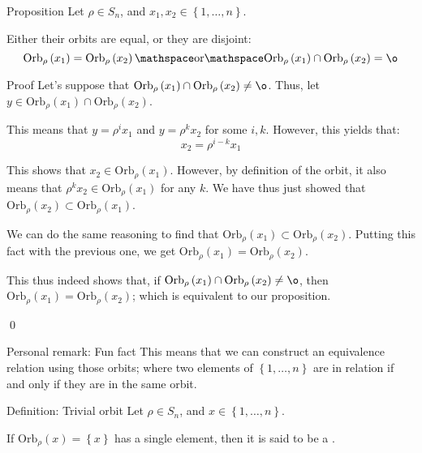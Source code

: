 \documentclass[a4paper]{article}
\begin{document}
\begin{parag}{Proposition}
    Let $\rho \in S_n$, and $x_1, x_2 \in \left\{1, \ldots, n\right\}$.

    Either their orbits are equal, or they are disjoint:
    \[\text{Orb}_{\rho}\left(x_1\right) = \text{Orb}_{\rho}\left(x_2\right) \mathspace \text{or} \mathspace \text{Orb}_{\rho}\left(x_1\right) \cap \text{Orb}_{\rho}\left(x_2\right) = \o\]

    \begin{subparag}{Proof}
        Let's suppose that $\text{Orb}_{\rho}\left(x_1\right) \cap \text{Orb}_{\rho}\left(x_2\right) \neq \o$. Thus, let $y \in \text{Orb}_{\rho}\left(x_1\right) \cap \text{Orb}_{\rho}\left(x_2\right)$.

        This means that $y = \rho^i x_1$ and $y = \rho^k x_2$ for some $i, k$. However, this yields that: 
        \[x_2 = \rho^{i - k}x_1\]
        
        This shows that $x_2 \in \text{Orb}_{\rho}\left(x_1\right)$. However, by definition of the orbit, it also means that $\rho^k x_2 \in \text{Orb}_{\rho}\left(x_1\right)$ for any $k$. We have thus just showed that $\text{Orb}_{\rho}\left(x_2\right) \subset \text{Orb}_{\rho}\left(x_1\right)$. 

        We can do the same reasoning to find that $\text{Orb}_{\rho}\left(x_1\right) \subset \text{Orb}_{\rho}\left(x_2\right)$. Putting this fact with the previous one, we get $\text{Orb}_{\rho}\left(x_1\right) = \text{Orb}_{\rho}\left(x_2\right)$.

        This thus indeed shows that, if $\text{Orb}_{\rho}\left(x_1\right) \cap \text{Orb}_{\rho}\left(x_2\right) \neq \o$, then $\text{Orb}_{\rho}\left(x_1\right) = \text{Orb}_{\rho}\left(x_2\right)$; which is equivalent to our proposition.

        \qed
    \end{subparag}

    \begin{subparag}{Personal remark: Fun fact}
        This means that we can construct an equivalence relation using those orbits; where two elements of $\left\{1, \ldots, n\right\}$ are in relation if and only if they are in the same orbit.
    \end{subparag}
\end{parag}

\begin{parag}{Definition: Trivial orbit}
    Let $\rho \in S_n$, and $x \in \left\{1, \ldots, n\right\}$.

    If $\text{Orb}_{\rho}\left(x\right) = \left\{x\right\}$ has a single element, then it is said to be a .
\end{parag}
\end{document}
